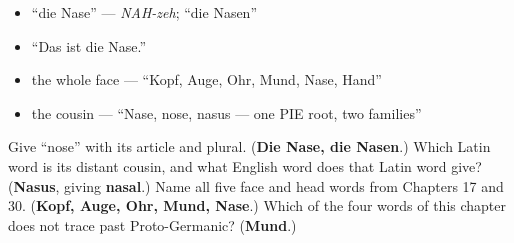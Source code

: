 \begin{itemize}
\raggedright
  \item \textquotedblleft{}die Nase\textquotedblright{} — \emph{NAH-zeh}; \textquotedblleft{}die Nasen\textquotedblright{}
  \item \textquotedblleft{}Das ist die Nase.\textquotedblright{}
  \item the whole face — \textquotedblleft{}Kopf, Auge, Ohr, Mund, Nase, Hand\textquotedblright{}
  \item the cousin — \textquotedblleft{}Nase, nose, nasus — one PIE root, two families\textquotedblright{}
\end{itemize}

\begin{tcolorbox}[breakable,colback=teal!4,colframe=teal!35!black,title={Before you move on}]
Give \textquotedblleft{}nose\textquotedblright{} with its article and plural. (\textbf{Die Nase, die Nasen}.) Which Latin word is its distant cousin, and what English word does that Latin word give? (\textbf{Nasus}, giving \textbf{nasal}.) Name all five face and head words from Chapters 17 and 30. (\textbf{Kopf, Auge, Ohr, Mund, Nase}.) Which of the four words of this chapter does not trace past Proto-Germanic? (\textbf{Mund}.)
\end{tcolorbox}
